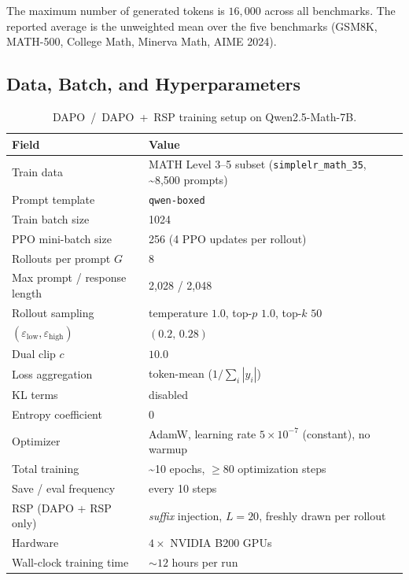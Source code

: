 The maximum number of generated tokens is $16{,}000$ across all benchmarks. The reported average is the unweighted mean over the five benchmarks (GSM8K, MATH-500, College Math, Minerva Math, AIME 2024).

\subsection{Data, Batch, and Hyperparameters}

\begin{table}[H]
\centering
\caption{DAPO~/~DAPO~+~RSP training setup on Qwen2.5-Math-7B.}
\label{tab:dapo_hp}
\footnotesize
\setlength{\tabcolsep}{4pt}
\renewcommand{\arraystretch}{0.9}
\begin{tabular}{ll}
\toprule
\textbf{Field} & \textbf{Value} \\
\midrule
Train data & MATH Level 3--5 subset (\texttt{simplelr\_math\_35}, \textasciitilde 8{,}500 prompts) \\
Prompt template & \texttt{qwen-boxed} \\
Train batch size & 1024 \\
PPO mini-batch size & 256 (4 PPO updates per rollout) \\
Rollouts per prompt $G$ & 8 \\
Max prompt / response length & 2{,}028 / 2{,}048 \\
Rollout sampling & temperature $1.0$, top-$p$ $1.0$, top-$k$ $50$ \\
\midrule
$(\varepsilon_{\text{low}},\varepsilon_{\text{high}})$ & $(0.2,\,0.28)$ \\
Dual clip $c$ & $10.0$ \\
Loss aggregation & token-mean ($1/\sum_i|y_i|$) \\
KL terms & disabled \\
Entropy coefficient & $0$ \\
\midrule
Optimizer & AdamW, learning rate $5\times10^{-7}$ (constant), no warmup \\
Total training & \textasciitilde 10 epochs, $\geq 80$ optimization steps \\
Save / eval frequency & every 10 steps \\
\midrule
RSP (DAPO + RSP only) & \emph{suffix} injection, $L=20$, freshly drawn per rollout \\
\midrule
Hardware & $4 \times$ NVIDIA B200 GPUs \\
Wall-clock training time & $\sim$$12$ hours per run \\
\bottomrule
\end{tabular}
\end{table}

